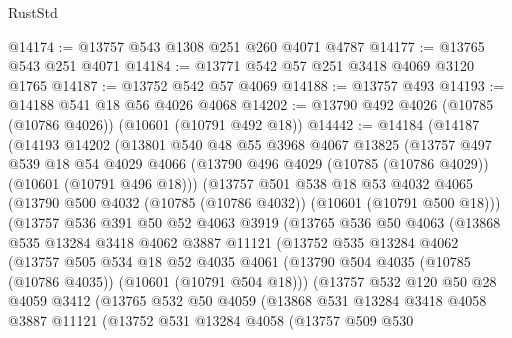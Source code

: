 \begin{lexlean}{RustStd}
\begin{coremodule}
@14174 := @13757 @543 @1308 @251 @260 @4071 @4787
@14177 := @13765 @543 @251 @4071
@14184 := @13771 @542 @57 @251 @3418 @4069 @3120 @1765
@14187 := @13752 @542 @57 @4069
@14188 := @13757 @493
@14193 := @14188 @541 @18 @56 @4026 @4068
@14202 := @13790 @492 @4026 (@10785 (@10786 @4026)) (@10601 (@10791 @492 @18))
@14442 := @14184
    (@14187
      (@14193
        @14202
        (@13801
          @540
          @48
          @55
          @3968
          @4067
          @13825
          (@13757
            @497
            @539
            @18
            @54
            @4029
            @4066
            (@13790 @496 @4029 (@10785 (@10786 @4029)) (@10601 (@10791 @496 @18)))
            (@13757
              @501
              @538
              @18
              @53
              @4032
              @4065
              (@13790 @500 @4032 (@10785 (@10786 @4032)) (@10601 (@10791 @500 @18)))
              (@13757
                @536
                @391
                @50
                @52
                @4063
                @3919
                (@13765
                  @536
                  @50
                  @4063
                  (@13868
                    @535
                    @13284
                    @3418
                    @4062
                    @3887
                    @11121
                    (@13752
                      @535
                      @13284
                      @4062
                      (@13757
                        @505
                        @534
                        @18
                        @52
                        @4035
                        @4061
                        (@13790 @504 @4035 (@10785 (@10786 @4035)) (@10601 (@10791 @504 @18)))
                        (@13757
                          @532
                          @120
                          @50
                          @28
                          @4059
                          @3412
                          (@13765
                            @532
                            @50
                            @4059
                            (@13868
                              @531
                              @13284
                              @3418
                              @4058
                              @3887
                              @11121
                              (@13752
                                @531
                                @13284
                                @4058
                                (@13757
                                  @509
                                  @530

\end{coremodule}
\end{lexlean}
